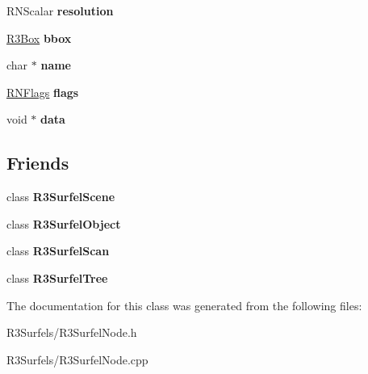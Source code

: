 \begin{DoxyCompactItemize}
\item 
R\+N\+Scalar {\bfseries resolution}\hypertarget{class_r3_surfel_node_aeddf84f09bc2a2d77380c0351385c2f0}{}\label{class_r3_surfel_node_aeddf84f09bc2a2d77380c0351385c2f0}

\item 
\hyperlink{class_r3_box}{R3\+Box} {\bfseries bbox}\hypertarget{class_r3_surfel_node_a794d5d09424953802338b89c78e99ccc}{}\label{class_r3_surfel_node_a794d5d09424953802338b89c78e99ccc}

\item 
char $\ast$ {\bfseries name}\hypertarget{class_r3_surfel_node_afb409f688b8b141df87a90311662fcb7}{}\label{class_r3_surfel_node_afb409f688b8b141df87a90311662fcb7}

\item 
\hyperlink{class_r_n_flags}{R\+N\+Flags} {\bfseries flags}\hypertarget{class_r3_surfel_node_a3b8738e3eaf90b58153b916910fc8b38}{}\label{class_r3_surfel_node_a3b8738e3eaf90b58153b916910fc8b38}

\item 
void $\ast$ {\bfseries data}\hypertarget{class_r3_surfel_node_a81cfe67a417fb3ca0b5658441f833571}{}\label{class_r3_surfel_node_a81cfe67a417fb3ca0b5658441f833571}

\end{DoxyCompactItemize}
\subsection*{Friends}
\begin{DoxyCompactItemize}
\item 
class {\bfseries R3\+Surfel\+Scene}\hypertarget{class_r3_surfel_node_af9bb32c0eac7d1d54787bbc6b44586b6}{}\label{class_r3_surfel_node_af9bb32c0eac7d1d54787bbc6b44586b6}

\item 
class {\bfseries R3\+Surfel\+Object}\hypertarget{class_r3_surfel_node_a850b1452c6e8af94bc02cc26bd2e5fe8}{}\label{class_r3_surfel_node_a850b1452c6e8af94bc02cc26bd2e5fe8}

\item 
class {\bfseries R3\+Surfel\+Scan}\hypertarget{class_r3_surfel_node_ad2e6d52df56aae73bbfe3d0723279197}{}\label{class_r3_surfel_node_ad2e6d52df56aae73bbfe3d0723279197}

\item 
class {\bfseries R3\+Surfel\+Tree}\hypertarget{class_r3_surfel_node_afe80cf8b46036b5125f7c9280809ed48}{}\label{class_r3_surfel_node_afe80cf8b46036b5125f7c9280809ed48}

\end{DoxyCompactItemize}


The documentation for this class was generated from the following files\+:\begin{DoxyCompactItemize}
\item 
R3\+Surfels/R3\+Surfel\+Node.\+h\item 
R3\+Surfels/R3\+Surfel\+Node.\+cpp\end{DoxyCompactItemize}
